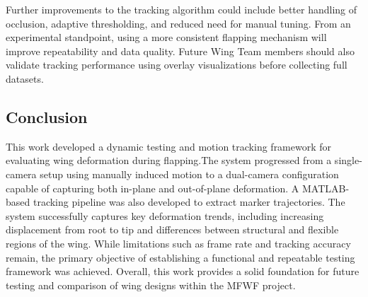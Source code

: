 Further improvements to the tracking algorithm could include better handling of occlusion, adaptive thresholding, and reduced need for manual tuning. From an experimental standpoint, using a more consistent flapping mechanism will improve repeatability and data quality. Future Wing Team members should also validate tracking performance using overlay visualizations before collecting full datasets.
 
\subsection{Conclusion}
 
This work developed a dynamic testing and motion tracking framework for evaluating wing deformation during flapping.The system progressed from a single-camera setup using manually induced motion to a dual-camera configuration capable of capturing both in-plane and out-of-plane deformation. A MATLAB-based tracking pipeline was also developed to extract marker trajectories. The system successfully captures key deformation trends, including increasing displacement from root to tip and differences between structural and flexible regions of the wing. While limitations such as frame rate and tracking accuracy remain, the primary objective of establishing a functional and repeatable testing framework was achieved. Overall, this work provides a solid foundation for future testing and comparison of wing designs within the MFWF project.
